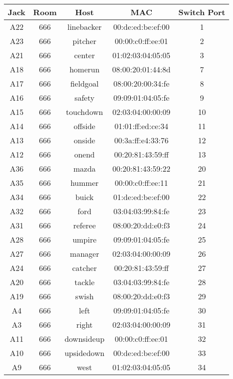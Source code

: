 \documentclass{article}
\begin{document}
\begin{table}[!htb]
	\centering
	\begin{tabular}{ | c | c | c | c | c | }
	\hline
	\textbf{Jack} & \textbf{Room} & \textbf{Host} & \textbf{MAC} & \textbf{Switch Port} \\ \hline
	A22 & 666 & linebacker & 00:de:ed:be:ef:00 & 1 \\ \hline
	A23 & 666 & pitcher & 00:00:c0:ff:ee:01 & 2 \\ \hline
	A21 & 666 & center & 01:02:03:04:05:05 & 3 \\ \hline
	A18 & 666 & homerun & 08:00:20:01:44:8d & 7 \\ \hline
	A17 & 666 & fieldgoal & 08:00:20:00:34:fe & 8 \\ \hline
	A16 & 666 & safety & 09:09:01:04:05:fe & 9 \\ \hline
	A15 & 666 & touchdown & 02:03:04:00:00:09 & 10 \\ \hline
	A14 & 666 & offside & 01:01:ff:ed:ce:34 & 11 \\ \hline
	A13 & 666 & onside & 00:3a:ff:e4:33:76 & 12 \\ \hline
	A12 & 666 & onend & 00:20:81:43:59:ff & 13 \\ \hline
	A36 & 666 & mazda & 00:20:81:43:59:22 & 20 \\ \hline
	A35 & 666 & hummer & 00:00:c0:ff:ee:11 & 21 \\ \hline
	A34 & 666 & buick & 01:de:ed:be:ef:00 & 22 \\ \hline
	A32 & 666 & ford & 03:04:03:99:84:fe & 23 \\ \hline
	A31 & 666 & referee & 08:00:20:dd:e0:f3 & 24 \\ \hline
	A28 & 666 & umpire & 09:09:01:04:05:fe & 25 \\ \hline
	A27 & 666 & manager & 02:03:04:00:00:09 & 26 \\ \hline
	A24 & 666 & catcher & 00:20:81:43:59:ff & 27 \\ \hline
	A20 & 666 & tackle & 03:04:03:99:84:fe & 28 \\ \hline
	A19 & 666 & swish & 08:00:20:dd:e0:f3 & 29 \\ \hline
	A4 & 666 & left & 09:09:01:04:05:fe & 30 \\ \hline
	A3 & 666 & right & 02:03:04:00:00:09 & 31 \\ \hline
	A11 & 666 & downsideup & 00:00:c0:ff:ee:01 & 32 \\ \hline
	A10 & 666 & upsidedown & 00:de:ed:be:ef:00 & 33 \\ \hline
	A9 & 666 & west  & 01:02:03:04:05:05 & 34 \\ \hline

\end{tabular}
\end{table}
\end{document}
